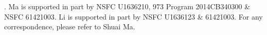 .
Ma is supported in part by NSFC {\small U1636210}, 973 Program {\small 2014CB340300} \& NSFC {\small 61421003}.
Li is supported in part by NSFC {\small U1636123 \& 61421003}.
 For any correspondence, please refer to Shuai Ma.
